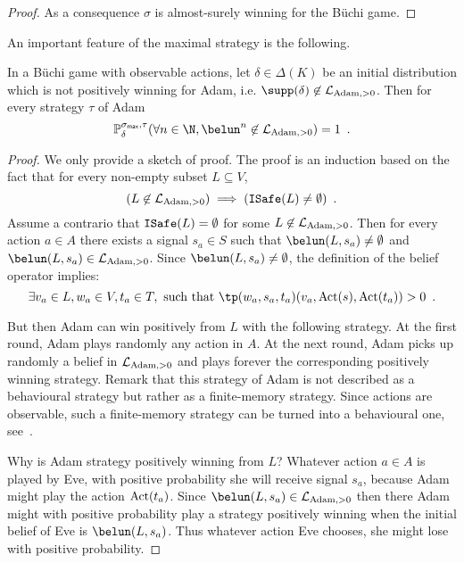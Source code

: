 \begin{proof}
As a consequence $\sigma$ is almost-surely winning for the 
B{\"u}chi game.
\end{proof}


An important feature of the maximal strategy is the following.
\begin{lemma}
In a B{\"u}chi game
with observable actions,
let $\delta\in\Delta(K)$ be an initial distribution which is not positively 
winning for Adam,
i.e. $\supp(\delta)\not\in\LLA$.
Then for every strategy $\tau$ of Adam
\begin{equation}
\label{eq:LLstable}
\mathbb{P}^{\sigma_\can,\tau}_{\delta}(\forall n \in \N, \belun^n \not\in\LLA )=1\enspace.
\end{equation}
\end{lemma}
\begin{proof}
We only provide a sketch of proof.
The proof is an induction based on the fact that for every non-empty subset $L\subseteq V$,
\[
(L\not \in \mathcal{L}_{\text{Adam},>0}) \implies ({\tt ISafe}(L)\neq \emptyset)\enspace.
\]
Assume a contrario that ${\tt ISafe}(L) = \emptyset$ for some $L\not \in \mathcal{L}_{\text{Adam},>0}$.
Then for every action $a\in A$ there exists a signal $s_a\in S$
such that $\belun(L,s_a)\neq \emptyset$ and $\belun(L,s_a) \in \LLA$.
Since $\belun(L,s_a)\neq \emptyset$, the definition of the belief operator implies:
\[
\exists v_a\in L, w_a\in V,  t_a \in T, \text{ such that }  \tp(w_a,s_a,t_a)(v_a,\Act(s),\Act(t_a)) > 0\enspace.
\]

But then Adam can win positively from $L$ with the following strategy.
At the first round, Adam plays randomly any action in $A$.
At the next round, Adam picks up randomly a belief in  $\mathcal{L}_{\text{Adam},>0}$ and 
plays forever the corresponding positively winning strategy.
Remark that this strategy of Adam is not described as a behavioural strategy
but rather as a finite-memory strategy. Since actions are observable,
such a finite-memory strategy can be turned into a behavioural one,
see~\cite[Lemma 4.6 and 4.7]{BGGjacm}.

Why is Adam strategy positively winning from $L$?
Whatever action $a\in A$ is played by Eve,
with positive probability she will receive signal $s_a$,
because Adam might play the action $\text{Act}(t_a)$.
Since $\belun(L,s_a) \in \LLA$ then there Adam might with positive probability
play a strategy positively winning when the initial belief
of Eve is $\belun(L,s_a)$. Thus whatever action Eve chooses,
she might lose with positive probability.

\end{proof}

